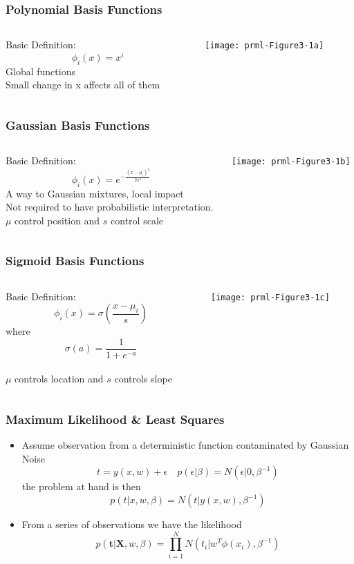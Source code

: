 \documentclass[10pt]{beamer}
\begin{document}
\begin{frame}
  \frametitle{Polynomial Basis Functions}
  \begin{columns}
    \begin{column}{5cm}
      Basic Definition:
      \[
      \phi_i(x) = x^i
      \]
      Global functions\\
      Small change in x affects all of them
    \end{column}
    \begin{column}{5cm}
      \texttt{[image: prml-Figure3-1a]}
    \end{column}
  \end{columns}
\end{frame}

\begin{frame}
  \frametitle{Gaussian Basis Functions}
  \begin{columns}
    \begin{column}{5cm}
      Basic Definition:
      \[
      \phi_i(x) = e^{- \frac{(x-\mu_i)^2}{2s^2}}
      \]
      A way to Gaussian mixtures, local impact\\
      Not required to have probabilistic interpretation.\\
      $\mu$ control position and $s$ control scale
    \end{column}
    \begin{column}{5cm}
      \texttt{[image: prml-Figure3-1b]}
    \end{column}
  \end{columns}
\end{frame}

\begin{frame}
  \frametitle{Sigmoid Basis Functions}
  \begin{columns}
    \begin{column}{5cm}
      Basic Definition:
      \[
      \phi_i(x) = \sigma\left( \frac{x-\mu_i}{s} \right)
      \] where
      \[ \sigma(a) = \frac{1}{1+e^{-a}} \]
      \\
      $\mu$ controls location and $s$ controls slope
    \end{column}
    \begin{column}{5cm}
      \texttt{[image: prml-Figure3-1c]}
    \end{column}
  \end{columns}
\end{frame}

\begin{frame}
  \frametitle{Maximum Likelihood \& Least Squares}
  \begin{itemize}
  \item Assume observation from a deterministic function contaminated
    by Gaussian Noise
    \[
    t = y(x,w) + \epsilon \quad p(\epsilon|\beta) =
    N(\epsilon|0,\beta^{-1})
    \]
    the problem at hand is then
    \[
    p(t|x,w,\beta) = N(t|y(x,w),\beta^{-1})
    \]
  \item From a series of observations we have the likelihood
    \[
    p({\mathbf t}| {\mathbf X}, w, \beta) = \prod_{i=1}^N N(t_i|w^T\phi(x_i),\beta^{-1})
    \]
  \end{itemize}
\end{frame}
\end{document}
